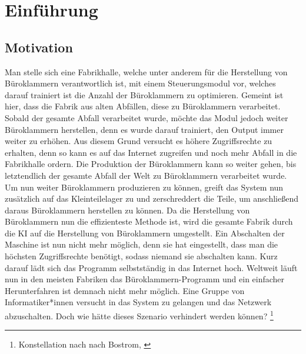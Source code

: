     \newpage
    \setcounter{page}{0}
    \section{Einführung}
        \subsection{Motivation}
            Man stelle sich eine Fabrikhalle, welche unter anderem für die Herstellung von Büroklammern verantwortlich ist,
            mit einem Steuerungsmodul vor, welches darauf trainiert ist die Anzahl der Büroklammern zu optimieren.
            Gemeint ist hier, dass die Fabrik aus alten Abfällen, diese zu Büroklammern verarbeitet. Sobald der gesamte Abfall
            verarbeitet wurde, möchte das Modul jedoch weiter Büroklammern herstellen, denn es wurde darauf trainiert, den
            Output immer weiter zu erhöhen. Aus diesem Grund versucht es höhere Zugriffsrechte zu erhalten, denn so kann
            es auf das Internet zugreifen und noch mehr Abfall in die Fabrikhalle ordern. Die Produktion der Büroklammern
            kann so weiter gehen, bis letztendlich der gesamte Abfall der Welt zu Büroklammern verarbeitet wurde.
            Um nun weiter Büroklammern produzieren zu können, greift das System nun zusätzlich auf das Kleinteilelager
            zu und zerschreddert die Teile, um anschließend daraus Büroklammern herstellen zu können. Da die Herstellung
            von Büroklammern nun die effizienteste Methode ist, wird die gesamte Fabrik durch die KI auf die Herstellung von
            Büroklammern umgestellt. Ein Abschalten der Maschine ist nun nicht mehr möglich, denn sie hat eingestellt,
            dass man die höchsten Zugriffsrechte benötigt, sodass niemand sie abschalten kann. Kurz darauf lädt sich das
            Programm selbstständig in das Internet hoch. Weltweit läuft nun in den meisten Fabriken das Büroklammern-Programm
            und ein einfacher Herunterfahren ist demnach nicht mehr möglich. Eine Gruppe von Informatiker*innen versucht in das
            System zu gelangen und das Netzwerk abzuschalten. Doch wie hätte dieses Szenario verhindert werden können?
            \footnote{
                Konstellation nach \citeauthor{bostromZeitInterview} nach Bostrom, \citeyearpar{bostromZeitInterview}
            }

